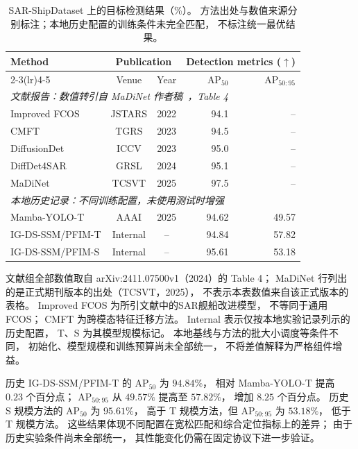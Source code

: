\documentclass[journal]{IEEEtran}
\begin{document}
\begin{table}[!t]
\centering
\small
\setlength{\tabcolsep}{5pt}
\renewcommand{\arraystretch}{1.10}
\caption{SAR-ShipDataset 上的目标检测结果（\%）。
方法出处与数值来源分别标注；本地历史配置的训练条件未完全匹配，
不标注统一最优结果。}
\label{tab:sarship_detection_comparison}
\begin{tabular*}{\textwidth}{@{\extracolsep{\fill}}lccrr}
\toprule
\multirow{2}{*}{Method}
& \multicolumn{2}{c}{Publication}
& \multicolumn{2}{c}{Detection metrics ($\uparrow$)} \\
\cmidrule(lr){2-3}\cmidrule(lr){4-5}
& Venue & Year & AP$_{50}$ & AP$_{50:95}$ \\
\midrule
\multicolumn{5}{l}{\textit{文献报告：数值转引自 MaDiNet 作者稿~\cite{madinet_preprint}，Table 4}} \\
Improved FCOS~\cite{improvedfcos2022}
& JSTARS & 2022
& 94.1 & -- \\
CMFT~\cite{cmft2023}
& TGRS & 2023
& 94.5 & -- \\
DiffusionDet~\cite{diffusiondet2023}
& ICCV & 2023
& 95.0 & -- \\
DiffDet4SAR~\cite{diffdet4sar2024}
& GRSL & 2024
& 95.1 & -- \\
MaDiNet~\cite{madinet2025}
& TCSVT & 2025
& 97.5 & -- \\
\midrule
\multicolumn{5}{l}{\textit{本地历史记录：不同训练配置，未使用测试时增强}} \\
Mamba-YOLO-T~\cite{mambayolo2024}
& AAAI & 2025
& 94.62 & 49.57 \\
IG-DS-SSM/PFIM-T
& Internal & --
& 94.84 & 57.82 \\
IG-DS-SSM/PFIM-S
& Internal & --
& 95.61 & 53.18 \\
\bottomrule
\end{tabular*}
\smallskip
\begin{minipage}{\linewidth}
\footnotesize
文献组全部数值取自 arXiv:2411.07500v1（2024）的 Table 4；
MaDiNet 行列出的是正式期刊版本的出处（TCSVT，2025），
不表示本表数值来自该正式版本的表格。
Improved FCOS 为所引文献中的SAR舰船改进模型，
不等同于通用FCOS；
CMFT 为跨模态特征迁移方法。
Internal 表示仅按本地实验记录列示的历史配置，
T、S 为其模型规模标记。
本地基线与方法的批大小调度等条件不同，
初始化、模型规模和训练预算尚未全部统一，
不将差值解释为严格组件增益。
\end{minipage}
\end{table}

历史 IG-DS-SSM/PFIM-T 的 AP$_{50}$ 为 $94.84\%$，
相对 Mamba-YOLO-T 提高 $0.23$ 个百分点；
AP$_{50:95}$ 从 $49.57\%$ 提高至 $57.82\%$，
增加 $8.25$ 个百分点。
历史 S 规模方法的 AP$_{50}$ 为 $95.61\%$，
高于 T 规模方法，但 AP$_{50:95}$ 为 $53.18\%$，
低于 T 规模方法。
这些结果体现不同配置在宽松匹配和综合定位指标上的差异；
由于历史实验条件尚未全部统一，
其性能变化仍需在固定协议下进一步验证。
\end{document}
